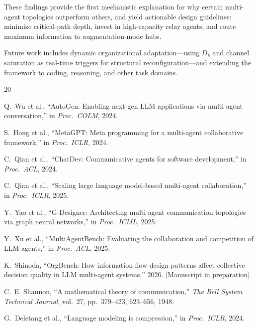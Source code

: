 \documentclass[conference]{IEEEtran}
\begin{document}
These findings provide the first mechanistic explanation for why certain multi-agent topologies outperform others, and yield actionable design guidelines: minimize critical-path depth, invest in high-capacity relay agents, and route maximum information to augmentation-mode hubs.

Future work includes dynamic organizational adaptation---using $D_k$ and channel saturation as real-time triggers for structural reconfiguration---and extending the framework to coding, reasoning, and other task domains.





\begin{thebibliography}{20}

Q.~Wu et al.,
``AutoGen: Enabling next-gen LLM applications via multi-agent conversation,''
in \emph{Proc.\ COLM}, 2024.

S.~Hong et al.,
``MetaGPT: Meta programming for a multi-agent collaborative framework,''
in \emph{Proc.\ ICLR}, 2024.

C.~Qian et al.,
``ChatDev: Communicative agents for software development,''
in \emph{Proc.\ ACL}, 2024.

C.~Qian et al.,
``Scaling large language model-based multi-agent collaboration,''
in \emph{Proc.\ ICLR}, 2025.

Y.~Yao et al.,
``G-Designer: Architecting multi-agent communication topologies via graph neural networks,''
in \emph{Proc.\ ICML}, 2025.

Y.~Xu et al.,
``MultiAgentBench: Evaluating the collaboration and competition of LLM agents,''
in \emph{Proc.\ ACL}, 2025.

K.~Shinoda,
``OrgBench: How information flow design patterns affect collective decision quality in LLM multi-agent systems,''
2026. [Manuscript in preparation]

C.~E. Shannon,
``A mathematical theory of communication,''
\emph{The Bell System Technical Journal}, vol.~27, pp.~379--423, 623--656, 1948.

G.~Deletang et al.,
``Language modeling is compression,''
in \emph{Proc.\ ICLR}, 2024.


\end{thebibliography}
\end{document}
